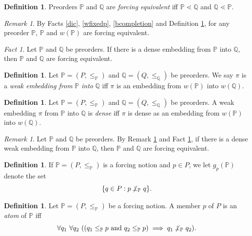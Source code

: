 \documentclass[12pt, twoside]{memoir}
\numberwithin{equation}{section}
\theoremstyle{definition}
\newtheorem{defi}[thm]{Definition}
\theoremstyle{remark}
\newtheorem{rem}[thm]{Remark}
\newtheorem{fact}[thm]{Fact}
\theoremstyle{definition}
\theoremstyle{definition}
\theoremstyle{definition}
\theoremstyle{remark}
\begin{document}
\begin{defi}\label{comdef}
Preorders $\mathbb{P}$ and $\mathbb{Q}$ are \emph{forcing equivalent} iff $\mathbb{P} \lessdot \mathbb{Q}$ and $\mathbb{Q} \lessdot \mathbb{P}$.
\end{defi}

\begin{rem}\label{sepeq}
By Facts \ref{dic}, \ref{wfixedp}, \ref{bcompletion} and Definition \ref{comdef}, for any preorder $\mathbb{P}$, $\mathbb{P}$ and $w(\mathbb{P})$ are forcing equivalent.
\end{rem}

\begin{fact}\label{defor}
Let $\mathbb{P}$ and $\mathbb{Q}$ be preorders. If there is a dense embedding from $\mathbb{P}$ into $\mathbb{Q}$, then $\mathbb{P}$ and $\mathbb{Q}$ are forcing equivalent.
\end{fact}

\begin{defi}
Let $\mathbb{P} = (P, \leq_{\mathbb{P}})$ and $\mathbb{Q} = (Q, \leq_{\mathbb{Q}})$ be preorders. We say $\pi$ is a \emph{weak embedding from} $\mathbb{P}$ \emph{into} $\mathbb{Q}$ iff $\pi$ is an embedding from $w(\mathbb{P})$ into $w(\mathbb{Q})$.
\end{defi}

\begin{defi}
Let $\mathbb{P} = (P, \leq_{\mathbb{P}})$ and $\mathbb{Q} = (Q, \leq_{\mathbb{Q}})$ be preorders. A weak embedding $\pi$ from $\mathbb{P}$ into $\mathbb{Q}$ is \emph{dense} iff $\pi$ is dense as an embedding from $w(\mathbb{P})$ into $w(\mathbb{Q})$.
\end{defi}

\begin{rem}\label{dwefor}
Let $\mathbb{P}$ and $\mathbb{Q}$ be preorders. By Remark \ref{sepeq} and Fact \ref{defor}, if there is a dense weak embedding from $\mathbb{P}$ into $\mathbb{Q}$, then $\mathbb{P}$ and $\mathbb{Q}$ are forcing equivalent.
\end{rem}

\begin{defi}
If $\mathbb{P} = (P, \leq_{\mathbb{P}})$ is a forcing notion and $p \in P$, we let $g_p (\mathbb{P})$ denote the set $$\{q \in P : p \not \! \! \bot_{\mathbb{P}} \ q\}.$$
\end{defi}

\begin{defi}
Let $\mathbb{P} = (P, \leq_{\mathbb{P}})$ be a forcing notion. A member $p$ of $P$ is an \emph{atom} of $\mathbb{P}$ iff $$\forall q_1 \ \forall q_2 \ ((q_1 \leq_{\mathbb{P}} p \text{ and } q_2 \leq_{\mathbb{P}} p) \implies q_1 \not \! \! \bot_{\mathbb{P}} \ q_2).$$
\end{defi}
\end{document}
